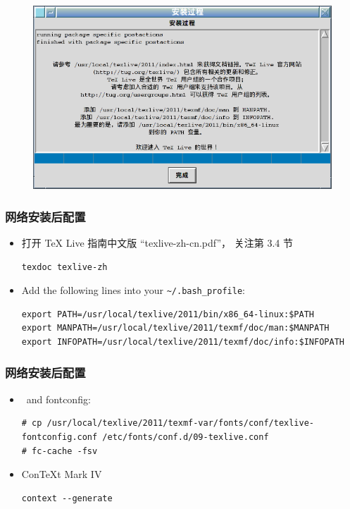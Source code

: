 \documentclass{beamer}
\def\TeXLive{\TeX{} Live\xspace}
\begin{document}
\begin{frame}
  \begin{figure}[h]
  \centering
\includegraphics[scale=0.5]{安装过程.png}
  \end{figure}
\end{frame}

\begin{frame}[fragile]
  \frametitle{网络安装后配置}
\begin{itemize}
  \item 
打开 \TeXLive 指南中文版 ``texlive-zh-cn.pdf''，
关注第 3.4 节
  \begin{lstlisting}
texdoc texlive-zh
  \end{lstlisting}

  \item 
    Add the following lines into your \nolinkurl{~/.bash_profile}:
    \begin{lstlisting}
export PATH=/usr/local/texlive/2011/bin/x86_64-linux:$PATH
export MANPATH=/usr/local/texlive/2011/texmf/doc/man:$MANPATH
export INFOPATH=/usr/local/texlive/2011/texmf/doc/info:$INFOPATH
    \end{lstlisting}

\end{itemize}
\end{frame}

\begin{frame}[fragile]
  \frametitle{网络安装后配置}
  \begin{itemize}
\item
\XeTeX\ and fontconfig:
\begin{lstlisting}
# cp /usr/local/texlive/2011/texmf-var/fonts/conf/texlive-fontconfig.conf /etc/fonts/conf.d/09-texlive.conf
# fc-cache -fsv
\end{lstlisting}

\item Con\TeX{}t Mark IV
  \begin{lstlisting}
context --generate
  \end{lstlisting}

\end{itemize}
\end{frame}
\end{document}
